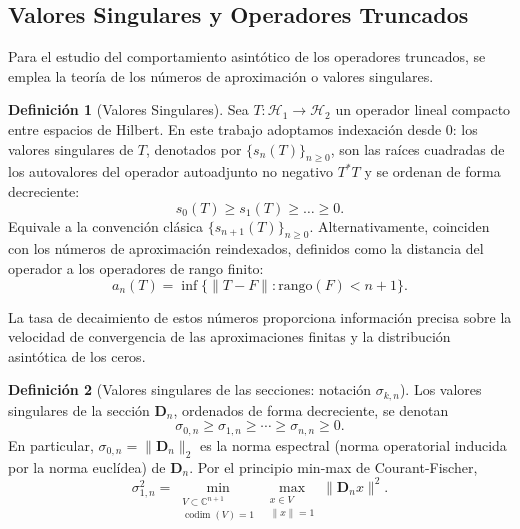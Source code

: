 \documentclass[12pt,a4paper]{article}
\theoremstyle{definition}
\newtheorem{definition}{Definición}
\theoremstyle{remark}
\begin{document}
\subsection{Valores Singulares y Operadores Truncados}

Para el estudio del comportamiento asintótico de los operadores truncados, se emplea la teoría de los números de aproximación o valores singulares.

\begin{definition}[Valores Singulares]
  Sea $T: \mathcal{H}_1 \to \mathcal{H}_2$ un operador lineal compacto entre espacios de Hilbert. En este trabajo adoptamos indexación desde $0$: los valores singulares de $T$, denotados por $\{s_n(T)\}_{n \geq 0}$, son las raíces cuadradas de los autovalores del operador autoadjunto no negativo $T^*T$ y se ordenan de forma decreciente:
  \begin{equation}
    s_0(T) \geq s_1(T) \geq \dots \geq 0.
  \end{equation}
  Equivale a la convención clásica $\{s_{n+1}(T)\}_{n\ge0}$. Alternativamente, coinciden con los números de aproximación reindexados, definidos como la distancia del operador a los operadores de rango finito:
  \begin{equation}
    a_n(T) = \inf \{ \|T - F\| : \text{rango}(F) < n+1 \}.
  \end{equation}
\end{definition}

La tasa de decaimiento de estos números proporciona información precisa sobre la velocidad de convergencia de las aproximaciones finitas y la distribución asintótica de los ceros.

\begin{definition}[Valores singulares de las secciones: notación $\sigma_{k,n}$]\label{def:sigma_kn}
  Los valores singulares de la sección $\mathbf{D}_n$, ordenados de forma decreciente, se denotan
  \[
    \sigma_{0,n} \geq \sigma_{1,n} \geq \cdots \geq \sigma_{n,n} \geq 0.
  \]
  En particular, $\sigma_{0,n} = \|\mathbf{D}_n\|_2$ es la norma espectral (norma operatorial inducida por la norma euclídea) de $\mathbf{D}_n$. Por el principio min-max de Courant-Fischer,
  \[
    \sigma_{1,n}^2 = \min_{\substack{V \subset \mathbb{C}^{n+1} \\ \operatorname{codim}(V) = 1}} \max_{\substack{x \in V \\ \|x\| = 1}} \|\mathbf{D}_n x\|^2.
  \]
\end{definition}
\end{document}
